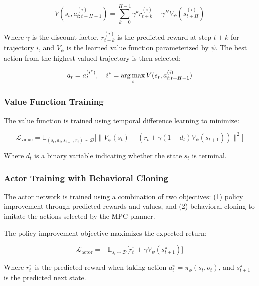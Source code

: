 \begin{equation}
V(s_t, a_{t:t+H-1}^{(i)}) = \sum_{k=0}^{H-1} \gamma^k r_{t+k}^{(i)} + \gamma^H V_\psi(s_{t+H}^{(i)})
\end{equation}

Where $\gamma$ is the discount factor, $r_{t+k}^{(i)}$ is the predicted reward at step $t+k$ for trajectory $i$, and $V_\psi$ is the learned value function parameterized by $\psi$. The best action from the highest-valued trajectory is then selected:

\begin{equation}
a_t = a_t^{(i^*)}, \quad i^* = \operatorname*{arg\,max}_i V(s_t, a_{t:t+H-1}^{(i)})
\end{equation}

\subsubsection{Value Function Training}

The value function is trained using temporal difference learning to minimize:

\begin{equation}
\mathcal{L}_{\text{value}} = \mathbb{E}_{(s_t, a_t, s_{t+1}, r_t) \sim \mathcal{D}}\Big[\|V_\psi(s_t) - (r_t + \gamma(1-d_t)V_\psi(s_{t+1}))\|^2\Big]
\end{equation}

Where $d_t$ is a binary variable indicating whether the state $s_t$ is terminal.

\subsubsection{Actor Training with Behavioral Cloning}

The actor network is trained using a combination of two objectives: (1) policy improvement through predicted rewards and values, and (2) behavioral cloning to imitate the actions selected by the MPC planner.

The policy improvement objective maximizes the expected return:

\begin{equation}
\mathcal{L}_{\text{actor}} = -\mathbb{E}_{s_t \sim \mathcal{D}}\Big[r_t^\pi + \gamma V_\psi(s_{t+1}^\pi)\Big]
\end{equation}

Where $r_t^\pi$ is the predicted reward when taking action $a_t^\pi = \pi_\phi(s_t, o_t)$, and $s_{t+1}^\pi$ is the predicted next state.

